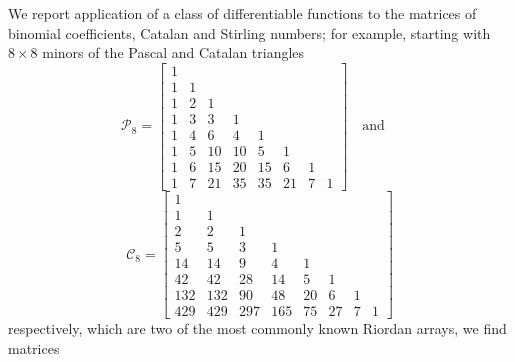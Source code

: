 We report application of a class of differentiable  functions
to the matrices of binomial coefficients, Catalan and Stirling numbers; for
example, starting with $8 \times 8$ minors of the Pascal and Catalan triangles
\begin{displaymath}
\mathcal{P}_{8}=\left[\begin{matrix}1 &   &   &   &   &   &   &  \\1 & 1 &   &   &   &   &   &  \\1 & 2 & 1 &   &   &   &   &  \\1 & 3 & 3 & 1 &   &   &   &  \\1 & 4 & 6 & 4 & 1 &   &   &  \\1 & 5 & 10 & 10 & 5 & 1 &   &  \\1 & 6 & 15 & 20 & 15 & 6 & 1 &  \\1 & 7 & 21 & 35 & 35 & 21 & 7 & 1\end{matrix}\right]
\quad\text{and}\quad
\end{displaymath}
\begin{displaymath}
\mathcal{C}_{8}=\left[\begin{matrix}1 &   &   &   &   &   &   &  \\1 & 1 &   &   &   &   &   &  \\2 & 2 & 1 &   &   &   &   &  \\5 & 5 & 3 & 1 &   &   &   &  \\14 & 14 & 9 & 4 & 1 &   &   &  \\42 & 42 & 28 & 14 & 5 & 1 &   &  \\132 & 132 & 90 & 48 & 20 & 6 & 1 &  \\429 & 429 & 297 & 165 & 75 & 27 & 7 & 1\end{matrix}\right]
\end{displaymath}
respectively, which are two of the most commonly known Riordan arrays, we find matrices
